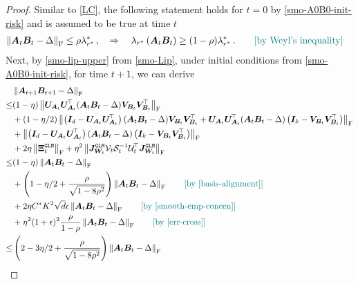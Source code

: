 \begin{proof}
    Similar to \cref{LC}, the following statement holds for $t=0$ by \ref{smo-A0B0-init-risk} and is assumed to be true at time $t$
    \begin{align*}
        \left\|\bm A_t \bm B_t - \Delta\right\|_{\rm F} & \leq \rho \lambda^*_{r^*}\,,\quad \Rightarrow \quad \lambda_{r^*}\left(\bm A_t \bm B_t\right) \geq (1-\rho)\lambda^*_{r^*}\,. \tag*{\color{teal}[by Weyl's inequality]}
    \end{align*}
    Next, by \cref{smo-lip-upper} from \cref{smo-Lip}, under initial conditions from \cref{smo-A0B0-init-risk},  for time $t+1$, we can derive
    \begin{align*}
        & \left\|\bm A_{t+1}\bm B_{t+1} - \Delta\right\|_{\rm F} \\
        \leq  & (1-\eta)\left\|\bm U_{\bm A_t} \bm U_{\bm A_t}^{\!\top}(\bm A_t \bm B_t - \Delta)\bm V_{\bm B_t} \bm V_{\bm B_t}^{\!\top}\right\|_{\rm F}\nonumber\\
        &  + (1-\eta/2) \left\|\left(\bm I_d - \bm U_{\bm A_t} \bm U_{\bm A_t}^{\!\top}\right)(\bm A_t \bm B_t - \Delta)\bm V_{\bm B_t} \bm V_{\bm B_t}^{\!\top}+\bm U_{\bm A_t} \bm U_{\bm A_t}^{\!\top}(\bm A_t \bm B_t - \Delta)\left(\bm I_k - \bm V_{\bm B_t} \bm V_{\bm B_t}^{\!\top}\right)\right\|_{\rm F}\nonumber\\
        &  + \left\|\left(\bm I_d - \bm U_{\bm A_t} \bm U_{\bm A_t}^{\!\top}\right)(\bm A_t \bm B_t - \Delta)\left(\bm I_k - \bm V_{\bm B_t} \bm V_{\bm B_t}^{\!\top}\right)\right\|_{\rm F}\nonumber\\
        &  + 2\eta\left\|\bm \Xi^{\tt GLM}_t\right\|_{\rm F}+\eta^2\left\|\bm J_{\bm W_t}^{\tt GLM} \mathcal{V}_t \mathcal{S}_t^{-1} \mathcal{U}^{\!\top}_t\bm J_{\bm W_t}^{\tt GLM}\right\|_{\rm F}\\
        \leq & (1-\eta)\left\|\bm A_t \bm B_t - \Delta\right\|_{\rm F}\\
        &  + \left(1-\eta/2+\frac{\rho}{\sqrt{1-8\rho^2}}\right)\left\|\bm A_t \bm B_t - \Delta\right\|_{\rm F}\tag*{\color{teal}[by \cref{basis-alignment}]}\\
        &  + 2\eta C^* K^2 \sqrt{d} \epsilon \left\|\bm A_t \bm B_t - \Delta\right\|_{\rm F}\tag*{\color{teal}[by \cref{smooth-emp-concen}]}\\
        &  + \eta^2 (1+\epsilon)^2 \frac{\rho}{1-\rho}\left\|\bm A_t\bm B_t-\Delta\right\|_{\rm F}\tag*{\color{teal}[by \cref{err-cross}]}\\
        \leq & \left(2-3\eta/2+ \frac{\rho}{\sqrt{1-8\rho^2}}\right)\left\|\bm A_t \bm B_t - \Delta\right\|_{\rm F}\\

\end{align*}
\end{proof}
